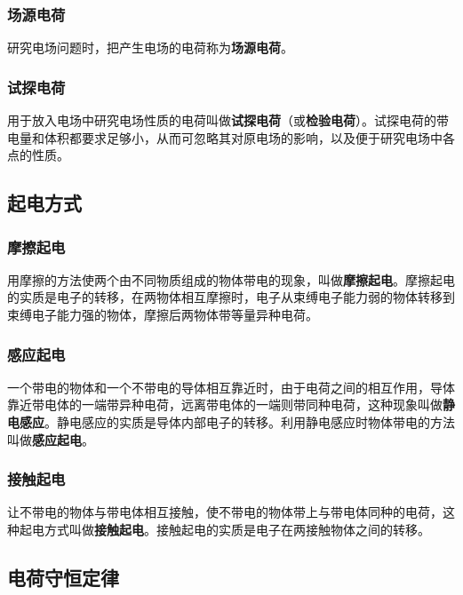 \subsubsection{场源电荷}

研究电场问题时，把产生电场的电荷称为\textbf{场源电荷}。

\subsubsection{试探电荷}

用于放入电场中研究电场性质的电荷叫做\textbf{试探电荷}（或\textbf{检验电荷}）。试探电荷的带电量和体积都要求足够小，从而可忽略其对原电场的影响，以及便于研究电场中各点的性质。

\subsection{起电方式}

\subsubsection{摩擦起电}

用摩擦的方法使两个由不同物质组成的物体带电的现象，叫做\textbf{摩擦起电}。摩擦起电的实质是电子的转移，在两物体相互摩擦时，电子从束缚电子能力弱的物体转移到束缚电子能力强的物体，摩擦后两物体带等量异种电荷。

\subsubsection{感应起电}

一个带电的物体和一个不带电的导体相互靠近时，由于电荷之间的相互作用，导体靠近带电体的一端带异种电荷，远离带电体的一端则带同种电荷，这种现象叫做\textbf{静电感应}。静电感应的实质是导体内部电子的转移。利用静电感应时物体带电的方法叫做\textbf{感应起电}。

\subsubsection{接触起电}

让不带电的物体与带电体相互接触，使不带电的物体带上与带电体同种的电荷，这种起电方式叫做\textbf{接触起电}。接触起电的实质是电子在两接触物体之间的转移。

\subsection{电荷守恒定律}


